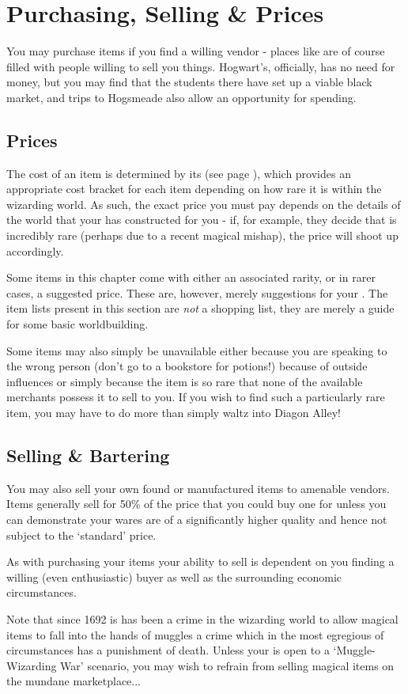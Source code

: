 \section{Purchasing, Selling \& Prices}


You may purchase items if you find a willing vendor - places like  are of course filled with people willing to sell you things. Hogwart's, officially, has no need for money, but you may find that the students there have set up a viable black market, and trips to Hogsmeade also allow an opportunity for spending. 


\subsection{Prices}

The cost of an item is determined by its (see page \pageref{S:ItemRarity}), which provides an appropriate cost bracket for each item depending on how rare it is within the wizarding world. As such, the exact price you must pay depends on the details of the world that your  has constructed for you - if, for example, they decide that  is incredibly rare (perhaps due to a recent magical mishap), the price will shoot up accordingly. 

Some items in this chapter come with either an associated rarity, or in rarer cases, a suggested price. These are, however, merely suggestions for your . The item lists present in this section are {\it not} a shopping list, they are merely a guide for some basic worldbuilding.

Some items may also simply be unavailable \minus{} either because you are speaking to the wrong person (don't go to a bookstore for potions!)\comma{} because of outside influences\comma{} or simply because the item is so rare that none of the available merchants possess it to sell to you. If you wish to find such a particularly rare item, you may have to do more than simply waltz into Diagon Alley! 

\subsection{Selling \& Bartering}

You may also sell your own found or manufactured items to amenable vendors. Items generally sell for 50\% of the price that you could buy one for\comma{} unless you can demonstrate your wares are of a significantly higher quality\comma{} and hence not subject to the `standard' price. 

As with purchasing your items\comma{} your ability to sell is dependent on you finding a willing (even enthusiastic) buyer\comma{} as well as the surrounding economic circumstances. 

Note that since 1692 is has been a crime in the wizarding world to allow magical items to fall into the hands of muggles \minus{} a crime which\comma{} in the most egregious of circumstances\comma{} has a punishment of death. Unless your  is open to a `Muggle-Wizarding War' scenario, you may wish to refrain from selling magical items on the mundane marketplace...


